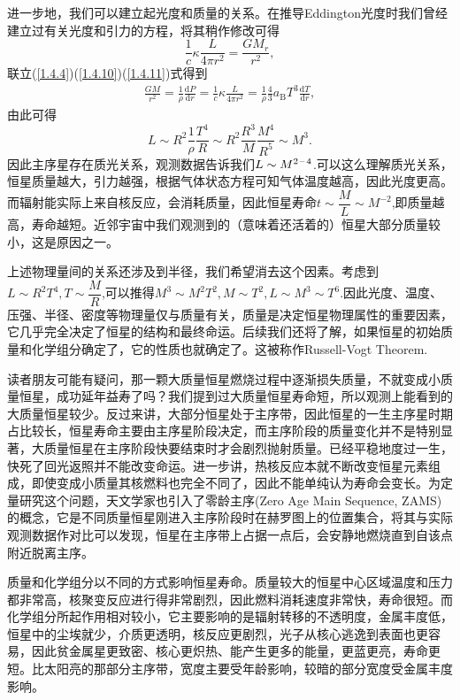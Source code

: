 \documentclass[../天体物理基础.tex]{subfiles}
\begin{document}
进一步地，我们可以建立起光度和质量的关系。在推导Eddington光度时我们曾经建立过有关光度和引力的方程，将其稍作修改可得
\begin{equation}
\frac{1}{c}\kappa\frac{L}{4\pi r^{2}}=\frac{GM_{r}}{r^{2}},\label{1.4.11}
\end{equation}
联立(\ref{1.4.4})(\ref{1.4.10})(\ref{1.4.11})式得到
\begin{align}
\frac{GM}{r^{2}}=\frac{1}{\rho}\frac{\mathrm{d}P}{\mathrm{d}r}=\frac{1}{c}\kappa\frac{L}{4\pi r^{2}}=\frac{1}{\rho}\frac{4}{3}a_{\text{B}}T^{3}\frac{\mathrm{d}T}{\mathrm{d}r},
\end{align}
由此可得
\begin{equation}
L\sim R^{2}\frac{1}{\rho}\frac{T^{4}}{R}\sim R^{2}\frac{R^{3}}{M}\frac{M^{4}}{R^{5}}\sim M^{3}.
\end{equation}
因此主序星存在质光关系，观测数据告诉我们$L\sim M^{2\,\text{\textendash}\,4}$.可以这么理解质光关系，恒星质量越大，引力越强，根据气体状态方程可知气体温度越高，因此光度更高。而辐射能实际上来自核反应，会消耗质量，因此恒星寿命$t\sim\dfrac{M}{L}\sim M^{-2}$,即质量越高，寿命越短。近邻宇宙中我们观测到的（意味着还活着的）恒星大部分质量较小，这是原因之一。

上述物理量间的关系还涉及到半径，我们希望消去这个因素。考虑到$L\sim R^{2}T^{4},T\sim\dfrac{M}{R}$,可以推得$M^{3}\sim M^{2}T^{2},M\sim T^{2},L\sim M^{3}\sim T^{6}$.因此光度、温度、压强、半径、密度等物理量仅与质量有关，质量是决定恒星物理属性的重要因素，它几乎完全决定了恒星的结构和最终命运。后续我们还将了解，如果恒星的初始质量和化学组分确定了，它的性质也就确定了。这被称作Russell-Vogt Theorem.

读者朋友可能有疑问，那一颗大质量恒星燃烧过程中逐渐损失质量，不就变成小质量恒星，成功延年益寿了吗？我们提到过大质量恒星寿命短，所以观测上能看到的大质量恒星较少。反过来讲，大部分恒星处于主序带，因此恒星的一生主序星时期占比较长，恒星寿命主要由主序星阶段决定，而主序阶段的质量变化并不是特别显著，大质量恒星在主序阶段快要结束时才会剧烈抛射质量。已经平稳地度过一生，快死了回光返照并不能改变命运。进一步讲，热核反应本就不断改变恒星元素组成，即使变成小质量其核燃料也完全不同了，因此不能单纯认为寿命会变长。为定量研究这个问题，天文学家也引入了零龄主序(Zero Age Main Sequence, ZAMS)的概念，它是不同质量恒星刚进入主序阶段时在赫罗图上的位置集合，将其与实际观测数据作对比可以发现，恒星在主序带上占据一点后，会安静地燃烧直到自该点附近脱离主序。

质量和化学组分以不同的方式影响恒星寿命。质量较大的恒星中心区域温度和压力都非常高，核聚变反应进行得非常剧烈，因此燃料消耗速度非常快，寿命很短。而化学组分所起作用相对较小，它主要影响的是辐射转移的不透明度，金属丰度低，恒星中的尘埃就少，介质更透明，核反应更剧烈，光子从核心逃逸到表面也更容易，因此贫金属星更致密、核心更炽热、能产生更多的能量，更蓝更亮，寿命更短。比太阳亮的那部分主序带，宽度主要受年龄影响，较暗的部分宽度受金属丰度影响。
\end{document}

